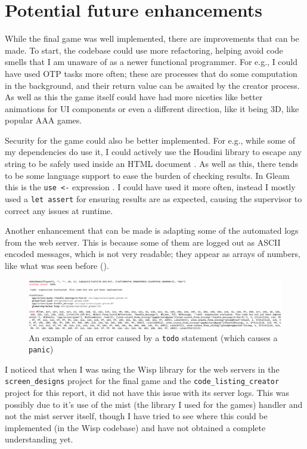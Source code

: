\documentclass[]{final}
\begin{document}
\section{Potential future enhancements}

While the final game was well implemented, there are improvements that can be
made. To start, the codebase could use more refactoring, helping avoid code
smells that I am unaware of as a newer functional programmer. For e.g., I could have
used OTP tasks more often; these are processes that do some computation in
the background, and their return value can be awaited by the creator process.
As well as this the game itself could have had more niceties like better
animations for UI components or even a different direction, like it being 3D,
like popular AAA games.

Security for the game could also be better implemented.
For e.g., while some of my dependencies do use it, I could actively use the
Houdini library to escape any string to be safely used inside an HTML document \cite{noauthor_houdini_nodate}.
As well as this,
there tends to be
some language support to ease the burden of checking results. In
Gleam this is the \lstinline|use <-| expression \cite{olano_gleam_2025}.
I could have used it more often, instead I mostly used a \lstinline|let assert|
for ensuring results are as expected, causing the supervisor to correct any
issues at runtime.

Another enhancement that can be made is adapting some of the automated logs
from the web server. This is because some of them are logged out as ASCII
encoded messages, which is not very readable; they appear as arrays of
numbers, like what was seen before {\hypersetup{linkcolor=teal}(\pageref{ascii})}.

\begin{figure}
  \includegraphics[width=\linewidth]{todo_ascii_err.png}
  \caption{An example of an error caused by a \lstinline|todo| statement (which causes a \lstinline|panic|)}
\end{figure}

I noticed that when I was using the Wisp library for the web servers in the
\lstinline|screen_designs| project for the final game and the
\lstinline|code_listing_creator| project for this report, it did not have
this issue with its server logs. This was possibly due
to it's use of the mist (the library I used for the games) handler and not the
mist server itself, though I have tried to see where this could be
implemented (in the Wisp codebase) and have not obtained a complete
understanding yet.
\end{document}
